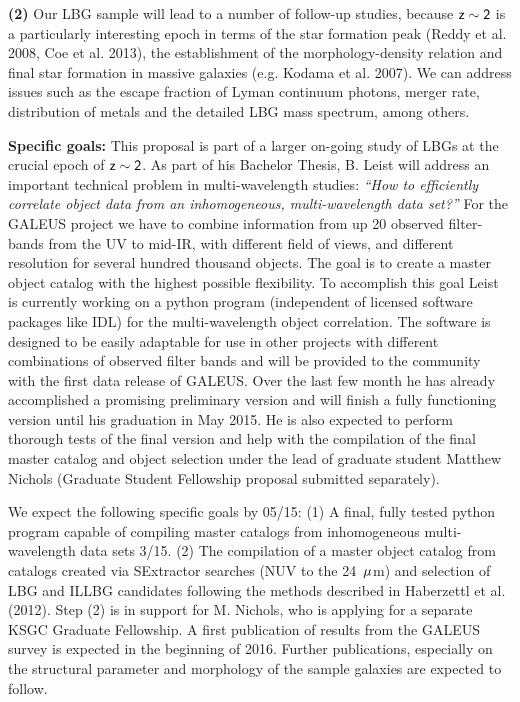 \documentclass[12pt]{article}
\begin{document}
\hspace{0.1in}
{\bf (2)} Our LBG sample will lead to a number of follow-up studies, because
$\sf z\sim 2$ is a particularly interesting epoch
in terms of the star formation peak (Reddy et al. 2008, Coe et al. 2013), the
establishment of the morphology-density relation and
final star formation in massive galaxies  (e.g. Kodama et al. 2007).
We can address issues such as the escape fraction of Lyman continuum photons,
merger rate, distribution of metals and the detailed LBG mass
spectrum, among others.


\hspace{0.1in}
{\bf Specific goals:} This proposal is part of a larger on-going study
of LBGs at the crucial epoch of $\sf z \sim 2$.
As part of his Bachelor Thesis, B. Leist will address an important
technical problem in multi-wavelength studies: {\it ``How to efficiently
correlate object data from an inhomogeneous, multi-wavelength data
set?''}  
For the GALEUS project we have to combine information from up 20
observed filter-bands from the UV to mid-IR, with different field of
views, and different resolution for several hundred thousand objects.
The goal is to create a master object catalog with the highest
possible flexibility. To accomplish this goal Leist is currently
working on a python program (independent of licensed software packages like
IDL) for the multi-wavelength object correlation. The software is
designed to be easily adaptable for use in other projects with
different combinations of observed filter bands and will be provided
to the community with the first data release of GALEUS.  
Over the last few month he has already accomplished a promising preliminary
version and will finish a fully functioning version until his
graduation in May 2015. He is also expected to perform thorough tests
of the final version and help with the compilation of the final master
catalog and object selection under the lead of graduate student
Matthew Nichols (Graduate Student Fellowship proposal submitted separately). 

We expect the following specific goals by 05/15: (1) A final, fully
tested python program capable of compiling master catalogs from
inhomogeneous multi-wavelength data sets 3/15.
(2) The compilation of a master object catalog from catalogs created
via SExtractor searches (NUV to the 24~$\sf \mu$m) and selection of
LBG and ILLBG candidates following the methods described in Haberzettl
et al. (2012). 
Step (2) is in support for M. Nichols, who is applying for a separate
KSGC Graduate Fellowship.
A first publication of results from the GALEUS survey is expected in
the beginning of 2016. Further publications, especially on the
structural parameter and morphology of the sample galaxies are
expected to follow. 
\end{document}
